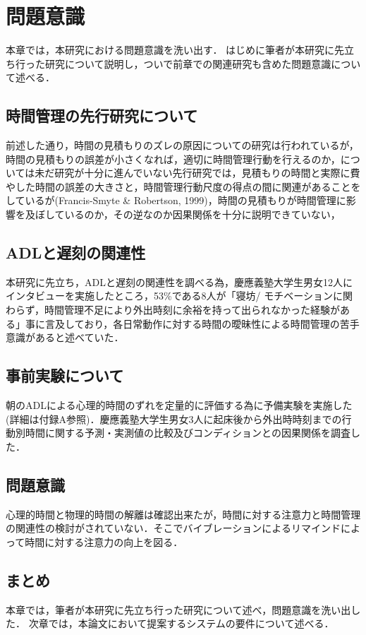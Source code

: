 \chapter{問題意識}
本章では，本研究における問題意識を洗い出す．
はじめに筆者が本研究に先立ち行った研究について説明し，ついで前章での関連研究も含めた問題意識について述べる．

\section{時間管理の先行研究について}
前述した通り，時間の見積もりのズレの原因についての研究は行われているが，時間の見積もりの誤差が小さくなれば，適切に時間管理行動を行えるのか，については未だ研究が十分に進んでいない先行研究では，見積もりの時間と実際に費やした時間の誤差の大きさと，時間管理行動尺度の得点の間に関連があることをしているが(Francis-Smyte \& Robertson, 1999)，時間の見積もりが時間管理に影響を及ぼしているのか，その逆なのか因果関係を十分に説明できていない，

\section{ADLと遅刻の関連性}
本研究に先立ち，ADLと遅刻の関連性を調べる為，慶應義塾大学生男女12人にインタビューを実施したところ，53\%である8人が「寝坊/ モチベーションに関わらず，時間管理不足により外出時刻に余裕を持って出られなかった経験がある」事に言及しており，各日常動作に対する時間の曖昧性による時間管理の苦手意識があると述べていた．

\section{事前実験について}
朝のADLによる心理的時間のずれを定量的に評価する為に予備実験を実施した(詳細は付録A参照)．慶應義塾大学生男女3人に起床後から外出時時刻までの行動別時間に関する予測・実測値の比較及びコンディションとの因果関係を調査した．
\section{問題意識}
心理的時間と物理的時間の解離は確認出来たが，時間に対する注意力と時間管理の関連性の検討がされていない．そこでバイブレーションによるリマインドによって時間に対する注意力の向上を図る．

\section{まとめ}
本章では，筆者が本研究に先立ち行った研究について述べ，問題意識を洗い出した．
次章では，本論文において提案するシステムの要件について述べる．